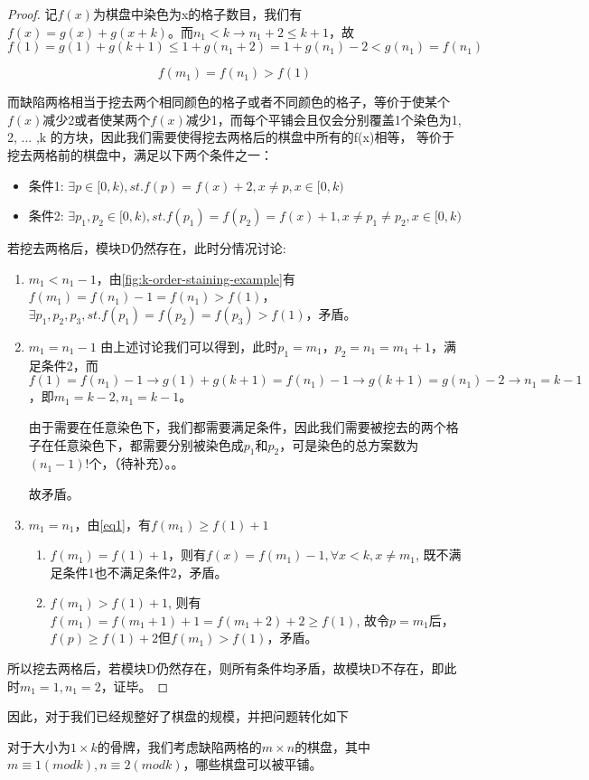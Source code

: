 \begin{proof}
    记$f(x)$为棋盘中染色为x的格子数目，我们有$f(x) = g(x) + g(x + k)$。而$n_1 < k \rightarrow n_1 + 2 \le k + 1$，故
    $f(1) = g(1) + g(k + 1) \le 1 + g(n_1 + 2) = 1 + g(n_1) - 2 < g(n_1) = f(n_1)$

    \begin{equation}
        \label{eq1}
        f(m_1) = f(n_1) > f(1)
    \end{equation}

    而缺陷两格相当于挖去两个相同颜色的格子或者不同颜色的格子，等价于使某个$f(x)$减少2或者使某两个$f(x)$减少1，而每个平铺会且仅会分别覆盖1个染色为1, 2, ... ,k 的方块，因此我们需要使得挖去两格后的棋盘中所有的f(x)相等，
    等价于挖去两格前的棋盘中，满足以下两个条件之一：

    \begin{itemize}
        \item 条件1: $\exists p \in [0, k), st. f(p) = f(x) + 2, x \neq p , x \in [0, k)$
        \item 条件2: $\exists p_1, p_2 \in [0, k), st. f(p_1) = f(p_2) = f(x) + 1, x \neq p_1 \neq p_2, x \in [0, k)$
    \end{itemize}

    若挖去两格后，模块D仍然存在，此时分情况讨论:

    \begin{enumerate}
        \item $m_1 < n_1 - 1$，由\ref*{fig:k-order-staining-example}有$f(m_1) = f(n_1) - 1 = f(n_1) > f(1)$，$\exists p_1, p_2, p_3, st. f(p_1) = f(p_2) = f(p_3) > f(1)$，矛盾。
        \item $m_1 = n_1 - 1$ 由上述讨论我们可以得到，此时$p_1 = m_1$，$p_2 = n_1 = m_1 + 1$，满足条件2，而$f(1) = f(n_1) - 1 \rightarrow g(1) + g(k + 1) = f(n_1) - 1 \rightarrow g(k + 1) = g(n_1) - 2 \rightarrow n_1 = k - 1$
              ，即$m_1 = k - 2, n_1 = k - 1$。

              由于需要在任意染色下，我们都需要满足条件，因此我们需要被挖去的两个格子在任意染色下，都需要分别被染色成$p_1$和$p_2$，可是染色的总方案数为$(n_1 - 1)!$个，（待补充）。。

              故矛盾。
        \item $m_1 = n_1$，由\ref*{eq1}，有$f(m_1) \ge f(1) + 1$
              \begin{enumerate}
                  \item $f(m_1) = f(1) + 1$，则有$f(x) = f(m_1) - 1, \forall x < k, x \neq m_1$, 既不满足条件1也不满足条件2，矛盾。
                  \item $f(m_1) > f(1) + 1$, 则有$f(m_1) = f(m_1 + 1) + 1 = f(m_1 + 2) + 2 \ge f(1)$, 故令$p = m_1$后，$f(p) \ge f(1) + 2$但$f(m_1) > f(1)$，矛盾。
              \end{enumerate}
    \end{enumerate}

    所以挖去两格后，若模块D仍然存在，则所有条件均矛盾，故模块D不存在，即此时$m_1 = 1, n_1 = 2$，证毕。
\end{proof}

因此，对于我们已经规整好了棋盘的规模，并把问题转化如下

对于大小为$1 \times k$的骨牌，我们考虑缺陷两格的$m \times n$的棋盘，其中$m \equiv 1 (mod k), n \equiv 2 (mod k)$，哪些棋盘可以被平铺。

\clearpage